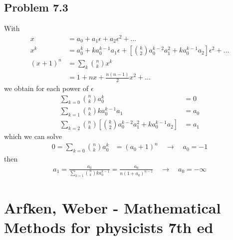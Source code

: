 \documentclass[10pt,a4paper]{book}
\theoremstyle{definition}
\begin{document}
\subsection{Problem 7.3}
With
\begin{align}
x&=a_0+a_1\epsilon+a_2\epsilon^2+...\\
x^k&=a_0^k+ka_0^{k-1}a_1\epsilon+\left[\binom{k}{2}a_0^{k-2}a_1^2+ka_0^{k-1}a_2\right]\epsilon^2+...\\
(x+1)^n
&=\sum_k\binom{n}{k}x^k\\
&=1+nx+\frac{n(n-1)}{2}x^2+...
\end{align}
we obtain for each power of $\epsilon$
\begin{align}
\sum_{k=0}\binom{n}{k}a_0^k&=0\\
\sum_{k=1}\binom{n}{k}ka_0^{k-1}a_1&=a_0\\
\sum_{k=2}\binom{n}{k}\left[\binom{k}{2}a_0^{k-2}a_1^2+ka_0^{k-1}a_2\right]&=a_1
\end{align}
which we can solve
\begin{align*}
0=\sum_{k=0}\binom{n}{k}a_0^k&=(a_0+1)^n\quad\rightarrow\quad a_0=-1
\end{align*}
then
\begin{align}
a_1=\frac{a_0}{\sum_{k=1}\binom{n}{k}ka_0^{k-1}}=\frac{a_0}{n(1+a_0)^{n-1}}\quad\rightarrow\quad a_0=-\infty
\end{align}

\section{{\sc Arfken, Weber} - Mathematical Methods for physicists 7th ed}
\end{document}
